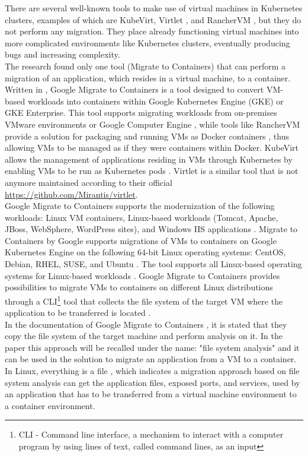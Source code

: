 \documentclass[twocolumn]{article}
\begin{document}
There are several well-known tools to make use of virtual machines in Kubernetes clusters, examples of which are KubeVirt, Virtlet \cite{Sheldon-2022}, and RancherVM \cite{Baccini-2021}, but they do not perform any migration. They place already functioning virtual machines into more complicated environments like Kubernetes clusters, eventually producing bugs and increasing complexity. \\

The research found only one tool (Migrate to Containers\cite{Google-2024}) that can perform a migration of an application, which resides in a virtual machine, to a container. Written in \cite{Google-2024}, Google Migrate to Containers is a tool designed to convert VM-based workloads into containers within Google Kubernetes Engine (GKE) or GKE Enterprise. This tool supports migrating workloads from on-premises VMware environments or Google Computer Engine \cite{Google-2024}, while tools like RancherVM provide a solution for packaging and running VMs as Docker containers \cite{Baccini-2021}, thus allowing VMs to be managed as if they were containers within Docker. KubeVirt allows the management of applications residing in VMs through Kubernetes by enabling VMs to be run as Kubernetes pods \cite{Sheldon-2022}. Virtlet is a similar tool \cite{Sheldon-2022} that is not anymore maintained according to their official \href{Github repository}{https://github.com/Mirantis/virtlet}. \\

Google Migrate to Containers supports the modernization of the following workloads: Linux VM containers, Linux-based workloads (Tomcat, Apache, JBoss, WebSphere, WordPress sites), and Windows IIS applications \cite{Google-2024}. Migrate to Containers by Google supports migrations of VMs to containers on Google Kubernetes Engine on the following 64-bit Linux operating systems: CentOS, Debian, RHEL, SUSE, and Ubuntu \cite{Google-2024}. The tool supports all Linux-based operating systems for Linux-based workloads \cite{Google-2024}. Google Migrate to Containers provides possibilities to migrate VMs to containers on different Linux distributions through a CLI\footnote{CLI - Command line interface, a mechanism to interact with a computer program by using lines of text, called command lines, as an input} tool that collects the file system of the target VM where the application to be transferred is located \cite{Google-2024}. \\

In the documentation of Google Migrate to Containers \cite{Google-2024}, it is stated that they copy the file system of the target machine and perform analysis on it. In the paper this approach will be recalled under the name: "file system analysis" and it can be used in the solution to migrate an application from a VM to a container. In Linux, everything is a file \cite{Torvalds-2002}, which indicates a migration approach based on file system analysis can get the application files, exposed ports, and services, used by an application that has to be transferred from a virtual machine environment to a container environment. \\
\end{document}
